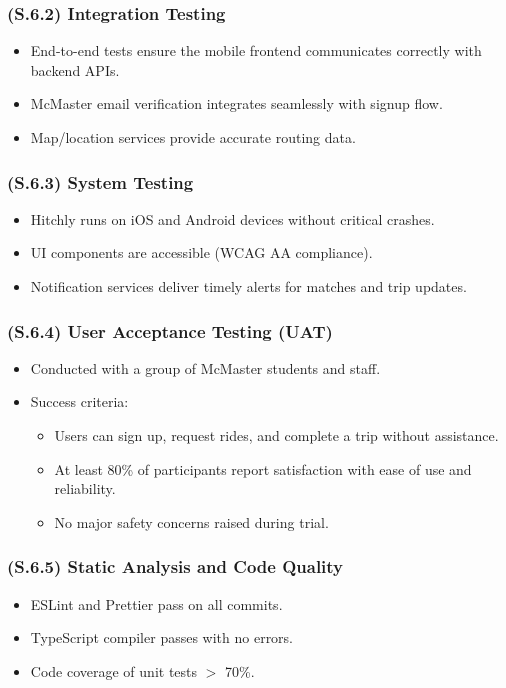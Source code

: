 \documentclass[12pt,letterpaper]{article}
\begin{document}
\subsubsection{(S.6.2) Integration Testing} %
\begin{itemize}
    \item End-to-end tests ensure the mobile frontend communicates correctly with backend APIs.
    \item McMaster email verification integrates seamlessly with signup flow.
    \item Map/location services provide accurate routing data.
\end{itemize}

\subsubsection{(S.6.3) System Testing} %
\begin{itemize}
    \item Hitchly runs on iOS and Android devices without critical crashes.
    \item UI components are accessible (WCAG AA compliance).
    \item Notification services deliver timely alerts for matches and trip updates.
\end{itemize}

\subsubsection{(S.6.4) User Acceptance Testing (UAT)} %
\begin{itemize}
    \item Conducted with a group of McMaster students and staff.
    \item Success criteria:
    \begin{itemize}
        \item Users can sign up, request rides, and complete a trip without assistance.
        \item At least 80\% of participants report satisfaction with ease of use and reliability.
        \item No major safety concerns raised during trial.
    \end{itemize}
\end{itemize}

\subsubsection{(S.6.5) Static Analysis and Code Quality} %
\begin{itemize}
    \item ESLint and Prettier pass on all commits.
    \item TypeScript compiler passes with no errors.
    \item Code coverage of unit tests $>$ 70\%.
\end{itemize}
\end{document}
